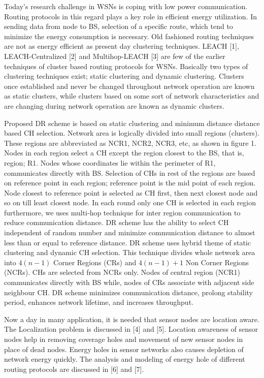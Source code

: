 \documentclass[3p,times,procedia]{elsarticle}
\begin{document}
Today's research challenge in WSNs is coping with low power communication. Routing protocols in this regard plays a key role in efficient energy utilization. In sending data from node to BS, selection of a specific route, which tend to minimize the energy consumption is necessary. Old fashioned routing techniques are not as energy efficient as present day clustering techniques. LEACH [1], LEACH-Centralized [2] and Multihop-LEACH [3] are few of the earlier techniques of cluster based routing protocols for WSNs. Basically two types of clustering techniques exist; static clustering and dynamic clustering. Clusters once established and never be changed throughout network operation are known as static clusters, while clusters based on some sort of network characteristics and are changing during network operation are known as dynamic clusters.

Proposed DR scheme is based on static clustering and minimum distance distance based CH selection. Network area is logically divided into small regions (clusters). These regions are abbreviated as NCR1, NCR2, NCR3, etc, as shown in figure 1. Nodes in each region select a CH except the region closest to the BS, that is, region; R1. Nodes whose coordinates lie within the perimeter of R1, communicates directly with BS. Selection of CHs in rest of the regions are based on reference point in each region; reference point is the mid point of each region. Node closest to reference point is selected as CH first, then next closest node and so on till least closest node. In each round only one CH is selected in each region furthermore, we uses multi-hop technique for inter region communication to reduce communication distance. DR scheme has the ability to select CH independent of random number and minimize communication distance to almost less than or equal to reference distance. DR scheme uses hybrid theme of static clustering and dynamic CH selection. This technique divides whole network area into $4(n-1)$ Corner Regions (CRs) and $4(n-1) + 1$ Non Corner Regions (NCRs). CHs are selected from NCRs only. Nodes of central region (NCR1) communicates directly with BS while, nodes of CRs associate with adjacent side neighbour CH. DR scheme minimizes communication distance, prolong stability period, enhances network lifetime, and increases throughput.

Now a day in many application, it is needed that sensor nodes are location aware. The Localization problem is discussed in [4] and [5]. Location awareness of sensor nodes help in removing coverage holes and movement of new sensor nodes in place of dead nodes. Energy holes in sensor networks also causes depletion of network energy quickly. The analysis and modeling of energy hole of different routing protocols are discussed in [6] and [7].
\end{document}
